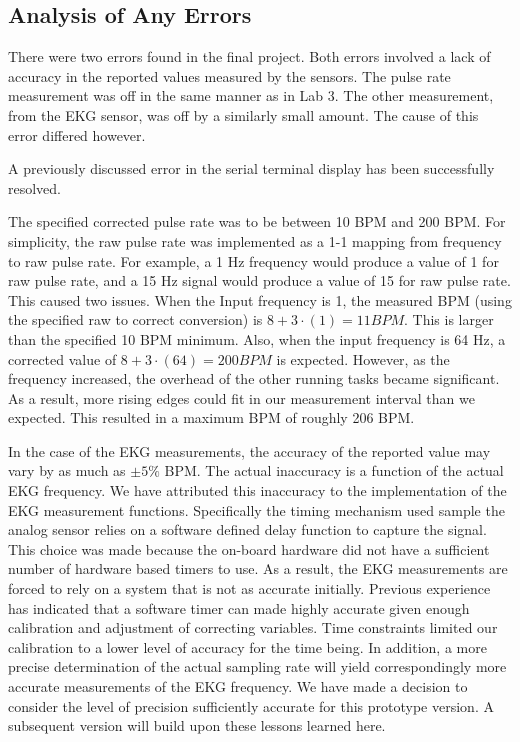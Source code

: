 \documentclass[12pt]{article} %
\begin{document}
    \subsection{Analysis of Any Errors}
    
		There were two errors found in the final project. Both errors involved a
		lack of accuracy in the reported values measured by the sensors. The pulse
		rate measurement was off in the same manner as in Lab 3. The other
		measurement, from the EKG sensor, was off by a similarly small amount. The
		cause of this error differed however.

		A previously discussed error in the serial terminal display has been
		successfully resolved.

    The specified corrected pulse rate was to be between 10 BPM and 200 BPM.
    For simplicity, the raw pulse rate was implemented as a 1-1 mapping from
    frequency to raw pulse rate.  For example, a 1 Hz frequency would produce a
    value of 1 for raw pulse rate, and a 15 Hz signal would produce a value of
    15 for raw pulse rate.  This caused two issues.  When the Input frequency
    is 1, the measured BPM (using the specified raw to correct conversion) is
    $8 + 3\cdot(1) = 11 BPM$.  This is larger than the specified 10 BPM
    minimum.  Also, when the input frequency is 64 Hz, a corrected value of 
    $8 + 3\cdot(64) = 200 BPM$ is expected.  However, as the frequency
    increased, the overhead of the other running tasks became significant.
    As a result, more rising edges could fit in our measurement interval
    than we expected.  This resulted in a maximum BPM of roughly 206 BPM.

		In the case of the EKG measurements, the accuracy of the reported value may
		vary by as much as $  \pm 5\%$ BPM. The actual inaccuracy is a function of the
		actual EKG frequency. We have attributed this inaccuracy to the
		implementation of the EKG measurement functions. Specifically the timing
		mechanism used sample the analog sensor relies on a software defined delay
		function to capture the signal. This choice was made because the on-board
		hardware did not have a sufficient number of hardware based timers to use.
		As a result, the EKG measurements are forced to rely on a system that is
		not as accurate initially. Previous experience has indicated that a
		software timer can made highly accurate given enough calibration and
		adjustment of correcting variables. Time constraints limited our
		calibration to a lower level of accuracy for the time being. In addition, a
		more precise determination of the actual sampling rate will yield
		correspondingly more accurate measurements of the EKG frequency. We have
		made a decision to consider the level of precision sufficiently accurate
		for this prototype version. A subsequent version will build upon these
		lessons learned here.
\end{document}
